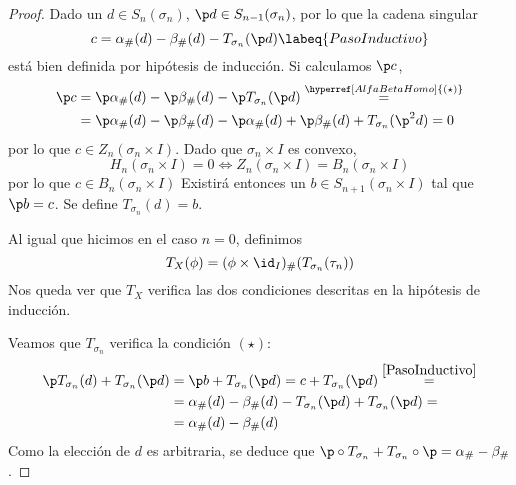 \begin{proof}
Dado un $d \in S_n(\sigma_n)$, $\p d \in S_{n-1}(\sigma_n)$, por lo que la cadena
singular
\begin{equation}
c=\alpha_\#(d)-\beta_\#(d)-T_{\sigma_n}(\p d)\labeq{PasoInductivo}
\end{equation}
está bien definida por hipótesis de inducción. Si calculamos $\p c$,
\begin{align*}
\p c&=\p\alpha_\#(d)-\p\beta_\#(d)-\p T_{\sigma_n}(\p d)
\stackrel{\hyperref[AlfaBetaHomo]{(\star)}}{=}\\
	&=\p\alpha_\#(d)-\p\beta_\#(d)-\p\alpha_\#(d)+\p\beta_\#(d)+
	T_{\sigma_n}(\p^2 d)=0
\end{align*}
por lo que $c \in Z_n(\sigma_n\times I)$. Dado que $\sigma_n\times I$ es convexo,
\[H_n(\sigma_n\times I)=
	0 \iff Z_n(\sigma_n\times I)=
	B_n(\sigma_n\times I)\]
por lo que $c \in B_n(\sigma_n\times I)$ Existirá entonces un $b \in
S_{n+1}(\sigma_n\times I)$ tal que $\p b=c$. Se define $T_{\sigma_n}(d)=b$.

Al igual que hicimos en el caso $n=0$, definimos
\[T_X(\phi)=(\phi\times \id_I)_\#(T_{\sigma_n}(\tau_n))\]
Nos queda ver que $T_X$ verifica las dos condiciones descritas en la hipótesis de
inducción.

Veamos que $T_{\sigma_n}$ verifica la condición $\hyperref[AlfaBetaHomo]{(\star)}$:
\begin{align*}
\p T_{\sigma_n}(d)+T_{\sigma_n}(\p d)&=
\p b+T_{\sigma_n}(\p d)=
c+T_{\sigma_n}(\p d)
\stackrel{\eqref{PasoInductivo}}{=}\\
&=\alpha_\#(d)-\beta_\#(d)-
T_{\sigma_n}(\p d)+T_{\sigma_n}(\p d)=\\
&=\alpha_\#(d)-\beta_\#(d)
\end{align*}
Como la elección de $d$ es arbitraria, se deduce que
$\p\circ T_{\sigma_n}+T_{\sigma_n}\circ\p=\alpha_\#-\beta_\#$.


\end{proof}
